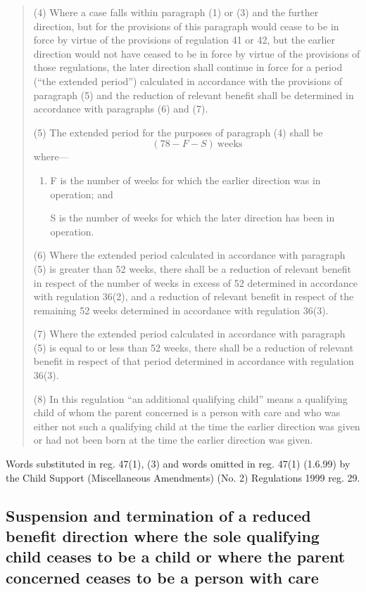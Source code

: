 \documentclass[a4paper,12pt]{article}
\begin{document}
{\begin{quotation}
(4) Where a case falls within paragraph (1) or (3) and the further direction, but for the provisions of this paragraph would cease to be in force by virtue of the provisions of regulation 41 or 42, but the earlier direction would not have ceased to be in force by virtue of the provisions of those regulations, the later direction shall continue in force for a period (“the extended period”) calculated in accordance with the provisions of paragraph (5) and the reduction of relevant benefit 
shall be determined in accordance with paragraphs (6) and (7).

(5) The extended period for the purposes of paragraph (4) shall be 
\[(78 - F - S) \ \mathrm{weeks}\]
 where—
\begin{enumerate}\item[]
F is the number of weeks for which the earlier direction was in operation; and

S is the number of weeks for which the later direction has been in operation.
\end{enumerate}

(6) Where the extended period calculated in accordance with paragraph (5) is greater than 52 weeks, there shall be a reduction of relevant benefit in respect of the number of weeks in excess of 52 determined in accordance with regulation 36(2), and a reduction of relevant benefit in respect of the remaining 52 weeks determined in accordance with regulation 36(3).

(7) Where the extended period calculated in accordance with paragraph (5) is equal to or less than 52 weeks, there shall be a reduction of relevant benefit in respect of that period determined in accordance with regulation 36(3).

(8) In this regulation “an additional qualifying child” means a qualifying child of whom the parent concerned is a person with care and who was either not such a qualifying child at the time the earlier direction was given or had not been born at the time the earlier direction was given.
\end{quotation}

Words substituted in reg. 47(1), (3) and words omitted in reg. 47(1) (1.6.99) by the Child Support (Miscellaneous Amendments) (No. 2) Regulations 1999 reg. 29.
}

\subsection[48. Suspension and termination of a reduced benefit direction where the sole qualifying child ceases to be a child or where the parent concerned ceases to be a person with care]{\sloppy Suspension and termination of a reduced benefit direction where the sole qualifying child ceases to be a child or where the parent concerned ceases to be a person with care}
\end{document}
